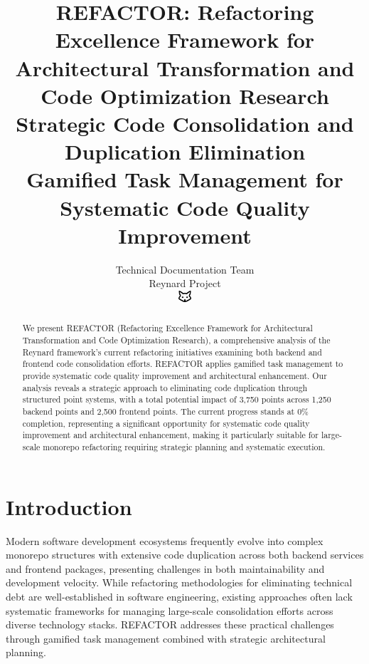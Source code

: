 \documentclass[10pt]{article}
\begin{document}
\title{REFACTOR: Refactoring Excellence Framework for Architectural Transformation and Code Optimization Research \\
\Large{Strategic Code Consolidation and Duplication Elimination} \\
\large{Gamified Task Management for Systematic Code Quality Improvement}}

\author{Technical Documentation Team\\
Reynard Project\\
\includegraphics[width=0.5cm]{../../shared-assets/favicon.pdf}}
\maketitle

\begin{abstract}
We present REFACTOR (Refactoring Excellence Framework for Architectural Transformation and Code Optimization Research), a comprehensive analysis of the Reynard framework's current refactoring initiatives examining both backend and frontend code consolidation efforts. REFACTOR applies gamified task management to provide systematic code quality improvement and architectural enhancement. Our analysis reveals a strategic approach to eliminating code duplication through structured point systems, with a total potential impact of 3,750 points across 1,250 backend points and 2,500 frontend points. The current progress stands at 0\% completion, representing a significant opportunity for systematic code quality improvement and architectural enhancement, making it particularly suitable for large-scale monorepo refactoring requiring strategic planning and systematic execution.
\end{abstract}

\section{Introduction}

Modern software development ecosystems frequently evolve into complex monorepo structures with extensive code duplication across both backend services and frontend packages, presenting challenges in both maintainability and development velocity. While refactoring methodologies for eliminating technical debt are well-established in software engineering, existing approaches often lack systematic frameworks for managing large-scale consolidation efforts across diverse technology stacks. REFACTOR addresses these practical challenges through gamified task management combined with strategic architectural planning.
\end{document}
